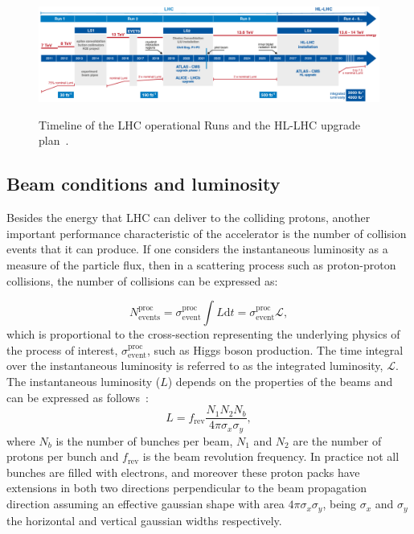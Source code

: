 \begin{figure}[htbp]
    \centering
    \includegraphics[width=1\linewidth]{images/HL-LHC_Plan_January2025.pdf}\\
    \caption{Timeline of the LHC operational Runs and the HL-LHC upgrade plan~\cite{HL-LHC_plans}.}
    \label{fig:LHC-HL}
\end{figure}


\subsection{Beam conditions and luminosity}
\label{subsec:lumi}
Besides the energy that LHC can deliver to the colliding protons, another important performance characteristic of the accelerator is the number of collision events that it can produce. If one considers the instantaneous luminosity as a measure of the particle flux, then in a scattering process such as proton-proton collisions, the number of collisions can be expressed as:

\begin{equation}
  N^{\text{proc}}_\text{{events}} = \sigma^{\text{proc}}_{\text{event}} \int L\text{d}t = \sigma^{\text{proc}}_{\text{event}}\mathcal{L},
\end{equation}
which is proportional to the cross-section representing the underlying physics of the process of interest, $\sigma^{\text{proc}}_{\text{event}}$, such as Higgs boson production. The time integral over the instantaneous luminosity is referred to as the integrated luminosity, $\mathcal{L}$. The instantaneous luminosity ($L$) depends on the properties of the beams and can be expressed as follows~\cite{Aad_2023}:
\begin{equation}
    L = f_{\text{rev}}\frac{N_1 N_2 N_b}{4\pi \sigma_x \sigma_y},
\end{equation}
where $N_b$ is the number of bunches per beam, $N_1$ and $N_2$ are the number of protons per bunch and $f_{\text{rev}}$ is the beam revolution frequency. In practice not all bunches are filled with electrons, and moreover these proton packs have extensions in both two directions perpendicular to the beam propagation direction assuming an effective gaussian shape with area $4\pi\sigma_{x}\sigma_{y}$, being $\sigma_{x}$ and $\sigma_{y}$ the horizontal and vertical gaussian widths respectively.  

